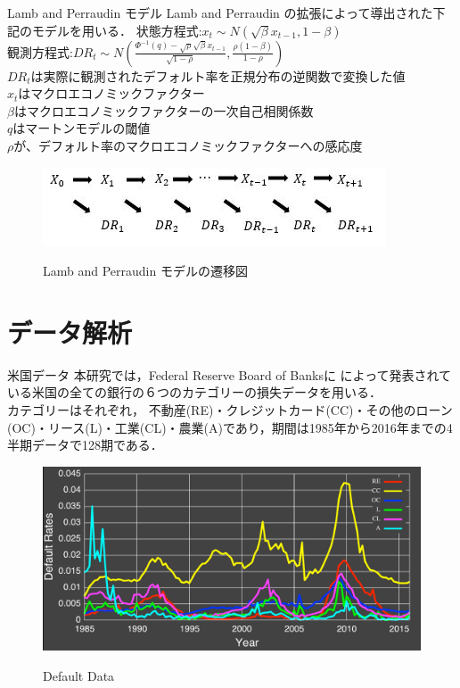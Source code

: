 \documentclass[dvipdfmx]{beamer}
\begin{document}
\begin{frame}{Lamb and Perraudin モデル}
Lamb and Perraudin の拡張によって導出された下記のモデルを用いる．
状態方程式:$x_t\sim N\left(\sqrt{\beta}x_{t-1} , 1-\beta\right)$\\
観測方程式:$DR_t\sim N\left( \frac{\Phi^{-1}(q)-\sqrt{\rho}\sqrt{\beta}x_{t-1}}{\sqrt{1-\rho}}, \frac{\rho(1 - \beta)}{1 - \rho}\right)$\\ $DR_t$は実際に観測されたデフォルト率を正規分布の逆関数で変換した値\\
$x_t$はマクロエコノミックファクター\\
$\beta$はマクロエコノミックファクターの一次自己相関係数\\
$q$はマートンモデルの閾値\\
$\rho$が、デフォルト率のマクロエコノミックファクターへの感応度
\begin{figure}[h]
\begin{center}
  \includegraphics[scale=0.8]{figure/state_space_lamb_and_perraudin.jpg} \\
\caption{Lamb and Perraudin モデルの遷移図}
\label{fig:Lamb and Perraudin モデルの遷移図}
\end{center}
\end{figure}
\end{frame}


\section{データ解析}
\begin{frame}{米国データ}
本研究では，Federal Reserve Board of Banksに
によって発表されている米国の全ての銀行の６つのカテゴリーの損失データを用いる．\\
カテゴリーはそれぞれ，
不動産(RE)・クレジットカード(CC)・その他のローン(OC)・リース(L)・工業(CL)・農業(A)であり，期間は1985年から2016年までの4半期データで128期である．\\
\begin{figure}[h]
\begin{center}
  \includegraphics[scale=0.33]{figure/default_data_2016.pdf} \\
\caption{Default Data}
\label{fig:data}
\end{center}
\end{figure}
\end{frame}
\end{document}

